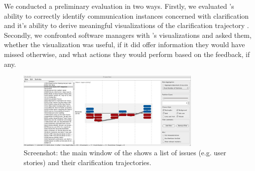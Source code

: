 We conducted a preliminary evaluation in two ways. Firstly, we evaluated \viss's ability to correctly identify communication instances concerned with clarification and it's ability to derive meaningful visualizations of the clarification trajectory \cite{Knauss2012f}. 
Secondly, we confronted software managers with \viss's visualizations and asked them, whether the visualization was useful, if it did offer information they would have missed otherwise, and what actions they would perform based on the feedback, if any. 

\begin{figure}
\centering
\includegraphics[width=0.8\textwidth]{img/vissuelizer-screenshot}
\caption{Screenshot: the main window of the \viss shows a list of issues (e.g. user stories) and their clarification trajectories.}
\label{fig:screenshot}
\end{figure}